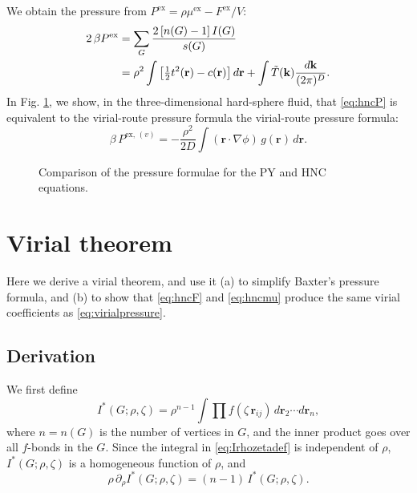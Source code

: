 \documentclass[aip,jcp,reprint,superscriptaddress]{revtex4-1}
\newcommand{\vct}[1]{\mathbf{#1}}
\providecommand{\vr}{} %
\renewcommand{\vr}{\vct{r}}
\newcommand{\vk}{\vct{k}}
\newcommand{\dvk}{\frac{d\vk}{(2\pi)^D}}
\newcommand{\supex}[1]{ { { #1 }^{ \mathrm{ex} } } }
\newcommand{\supexv}[1]{ { { #1 }^{ \mathrm{ex}, \, (v) } } }
\newcommand{\Pex}{\supex{P}}
\newcommand{\Pexv}{\supexv{P}}
\newcommand{\Fex}{\supex{F}}
\newcommand{\muex}{\supex{\mu}}
\begin{document}
We obtain the pressure from
  $\Pex = \rho \muex - \Fex/V$:
%
\begin{align}
2 \, \beta \Pex
&=
\sum_G \frac{ 2 \, [n(G) - 1] \, I(G) } { s(G) }
\notag \\
&=
\rho^2 \int
  \left[
    \tfrac{1}{2} t^2(\vr) - c(\vr)
  \right] d\vr
  +\int \tilde T(\vk) \dvk.
\label{eq:hncP}
\end{align}
%
In Fig. \ref{fig:iepres},
we show, in the three-dimensional hard-sphere fluid,
that
\eqref{eq:hncP}
is equivalent to the virial-route pressure formula
%
the virial-route pressure formula:
\begin{equation}
  \beta \, \Pexv
=
  - \frac{\rho^2}{2D}
  \int (\vr \cdot \nabla\phi) \, g(\vr) \, d\vr.
\label{eq:virialpressure}
\end{equation}

\begin{figure}[h]
  \caption{\label{fig:iepres}
  Comparison of the pressure formulae for the PY and HNC equations.}
\end{figure}







\section{Virial theorem}

Here we derive a virial theorem,
and use it
(a) to simplify Baxter's pressure formula,
and
(b) to show that \eqref{eq:hncF} and \eqref{eq:hncmu}
produce the same virial coefficients as \eqref{eq:virialpressure}.



\subsection{Derivation}

We first define
\begin{equation}
  I^*(G; \rho, \zeta)
  = \rho^{n-1} \int \prod f(\zeta \, \vr_{ij}) \, d\vr_2 \cdots d\vr_n,
  \label{eq:Irhozetadef}
\end{equation}
where $n = n(G)$ is the number of vertices in $G$,
and the inner product goes over all $f$-bonds in the $G$.
Since the integral in \eqref{eq:Irhozetadef} is independent of $\rho$,
$I^*(G;\rho, \zeta)$ is a homogeneous function of $\rho$, and
%
\begin{equation}
  \rho \, \partial_\rho I^*(G; \rho, \zeta)
  = (n - 1) \, I^*(G; \rho, \zeta).
  \label{eq:Idrho}
\end{equation}
\end{document}
